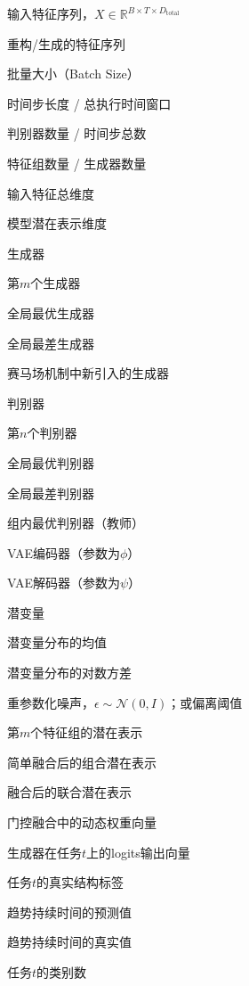 \item[$X$] 输入特征序列，$X \in \mathbb{R}^{B \times T \times D_{\text{total}}}$
\item[$\hat{X}$] 重构/生成的特征序列
\item[$B$] 批量大小（Batch Size）
\item[$T$] 时间步长度 / 总执行时间窗口
\item[$N$] 判别器数量 / 时间步总数
\item[$M$] 特征组数量 / 生成器数量
\item[$D_{\text{total}}$] 输入特征总维度
\item[$d_{\text{model}}$] 模型潜在表示维度
\item[$G$] 生成器
\item[$G_m$] 第$m$个生成器
\item[$G^{\star}$] 全局最优生成器
\item[$G^{\dagger}$] 全局最差生成器
\item[$G_{\text{new}}$] 赛马场机制中新引入的生成器
\item[$D$] 判别器
\item[$D_n$] 第$n$个判别器
\item[$D^{\star}$] 全局最优判别器
\item[$D^{\dagger}$] 全局最差判别器
\item[$D^{(t)}$] 组内最优判别器（教师）
\item[$E_{\phi}$] VAE编码器（参数为$\phi$）
\item[$\text{Dec}_{\psi}$] VAE解码器（参数为$\psi$）
\item[$z$] 潜变量
\item[$\mu$] 潜变量分布的均值
\item[$\log \sigma^2$] 潜变量分布的对数方差
\item[$\epsilon$] 重参数化噪声，$\epsilon \sim \mathcal{N}(0,I)$；或偏离阈值
\item[$h_{G_m}$] 第$m$个特征组的潜在表示
\item[$h_{\text{combined}}$] 简单融合后的组合潜在表示
\item[$h_{\text{fused}}$] 融合后的联合潜在表示
\item[$\mathbf{w}$] 门控融合中的动态权重向量
\item[$p_t$] 生成器在任务$t$上的logits输出向量
\item[$y_t$] 任务$t$的真实结构标签
\item[$\hat{L}_t$] 趋势持续时间的预测值
\item[$L_t$] 趋势持续时间的真实值
\item[$K_t$] 任务$t$的类别数
